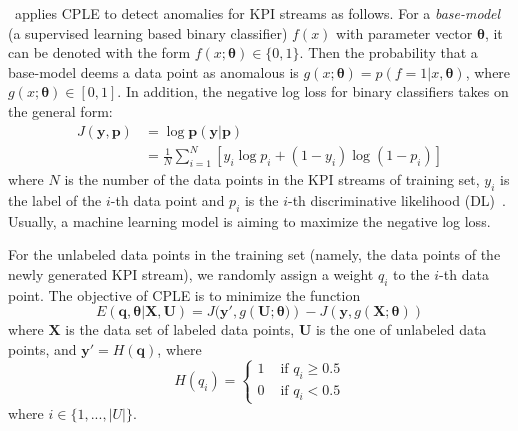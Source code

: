 \name~applies CPLE to detect anomalies for KPI streams as follows.
For a \emph{base-model} (a supervised learning based binary classifier) $f(x)$ with parameter vector $\mathbf{\theta}$, it can be denoted with the form $f(x;\mathbf{\theta})\in\{0,1\}$.
Then the probability that a base-model deems a data point as anomalous is $g(x;\mathbf{\theta})=p(f=1|x,\mathbf{\theta})$, where $g(x;\mathbf{\theta})\in[0,1]$.
In addition, the negative log loss for binary classifiers takes on the general form:
\begin{equation}
\begin{aligned}
J(\mathbf{y,p})&=\log \mathbf{p(y|p)}\\
&=\frac{1}{N}\sum_{i=1}^{N}[y_i\log p_i + (1-y_i)\log (1-p_i)]
\end{aligned}
\label{eqn:log_loss}
\end{equation}
where $N$ is the number of the data points in the KPI streams of training set, $y_i$ is the label of the $i$-th data point and $p_i$ is the $i$-th discriminative likelihood (DL)~\cite{ng2002discriminative}. 
Usually, a machine learning model is aiming to maximize the negative log loss.


For the unlabeled data points in the training set (namely, the data points of the newly generated KPI stream), we randomly assign a weight $q_i$ to the $i$-th data point.
The objective of CPLE is to minimize the function
\begin{equation}\label{eq:objective}
E(\mathbf{q,\theta|X,U})=J(\mathbf{y',}g(\mathbf{U;\theta)})-J(\mathbf{y},g(\mathbf{X;\theta}))
\end{equation}
where $\mathbf{X}$ is the data set of labeled data points, $\mathbf{U}$ is the one of unlabeled data points, and $\mathbf{y'}=H(\mathbf{q})$, where
\begin{equation}\label{eq:y}
H({q_i})=\begin{cases}
 1& \text{ if } q_i \geq 0.5\\ 
 0& \text{ if }  q_i < 0.5
\end{cases}
\end{equation}
where $i\in\{1,...,|U|\}$.

